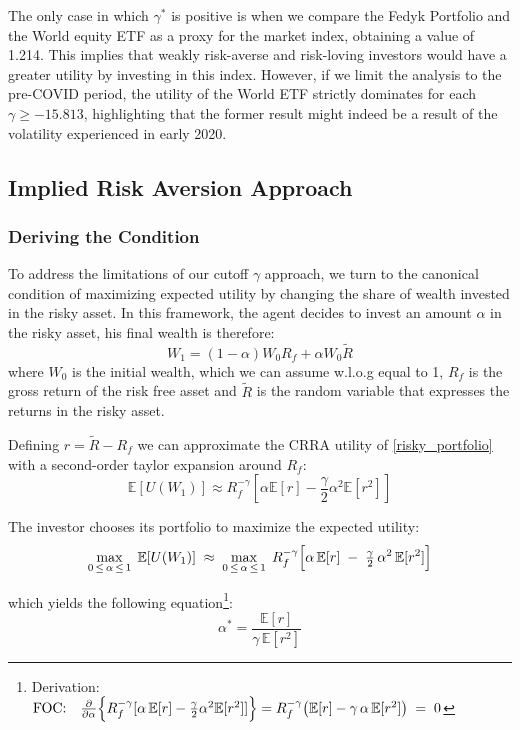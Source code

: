 The only case in which $\gamma^*$ is positive is when we compare the Fedyk Portfolio and the World equity ETF as a proxy for the market index, obtaining a value of 1.214.
This implies that weakly risk-averse and risk-loving investors would have a greater utility by investing in this index.
However, if we limit the analysis to the pre-COVID period, the utility of the World ETF strictly dominates for each $\gamma\geq-15.813$, 
highlighting that the former result might indeed be a result of the volatility experienced in early 2020.  

\subsection{Implied Risk Aversion Approach}
\subsubsection{Deriving the Condition}
To address the limitations of our cutoff $\gamma$ approach, we turn to the canonical condition of maximizing expected utility by changing the share of wealth invested in the risky asset.  
In this framework, the agent decides to invest an amount $\alpha$ in the risky asset, his final wealth is therefore:
\begin{equation}
    W_1 = (1-\alpha) W_0 R_f  + \alpha W_0 \tilde R 
    \label{risky_portfolio}
\end{equation}
where $W_0$ is the initial wealth, which we can assume w.l.o.g equal to 1, $R_f$ is the gross return of the risk free asset and $\tilde R$ is the random variable that expresses the returns in the risky asset.

Defining $r=\tilde R - R_f$ we can approximate the CRRA utility of \ref{risky_portfolio} with a second-order taylor expansion around $R_f$:
\begin{equation}
    \mathbb{E}[U(W_1)] \approx R_f^{-\gamma} [\alpha \mathbb{E}[r] - \frac{\gamma}{2}\alpha^2\mathbb{E}[r^2]]
\end{equation} 

The investor chooses its portfolio to maximize the expected utility:
\begin{equation}
    \max_{0 \,\le\, \alpha \,\le\, 1}\; \mathbb{E}[U(W_1)]
    \;\approx\;
    \max_{0 \,\le\, \alpha \,\le\, 1}\;
    R_f^{-\gamma}\Bigl[\alpha\,\mathbb{E}[r]\;-\;\tfrac{\gamma}{2}\,\alpha^2\,\mathbb{E}[r^2]\Bigr]
\end{equation}

which yields the following equation\footnote{
    Derivation:
    $\text{FOC:}\quad
    \frac{\partial}{\partial \alpha}\Bigl\{R_f^{-\gamma}[\alpha\,\mathbb{E}[r]-\tfrac{\gamma}{2}\alpha^2\mathbb{E}[r^2]]\Bigr\}
    =
    R_f^{-\gamma}\bigl(\mathbb{E}[r]-\gamma\,\alpha\,\mathbb{E}[r^2]\bigr)
    \;=\;0$}:
\begin{equation}
    \alpha^*=
    \frac{\mathbb{E}[r]}{\gamma\,\mathbb{E}[r^2]}
\end{equation}

